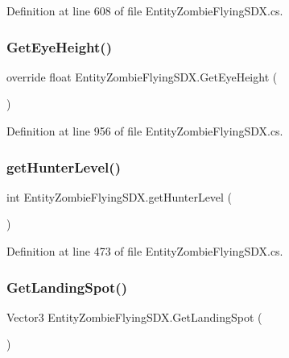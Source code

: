 Definition at line 608 of file Entity\+Zombie\+Flying\+S\+D\+X.\+cs.

\mbox{\label{class_entity_zombie_flying_s_d_x_a947821e6f45d591ca5e5bda52b58ff48}} 
\subsubsection{\texorpdfstring{GetEyeHeight()}{GetEyeHeight()}}
{\footnotesize\ttfamily override float Entity\+Zombie\+Flying\+S\+D\+X.\+Get\+Eye\+Height (\begin{DoxyParamCaption}{ }\end{DoxyParamCaption})}



Definition at line 956 of file Entity\+Zombie\+Flying\+S\+D\+X.\+cs.

\mbox{\label{class_entity_zombie_flying_s_d_x_ad26e497d00cc42de478bdbaaec5c6c70}} 
\subsubsection{\texorpdfstring{getHunterLevel()}{getHunterLevel()}}
{\footnotesize\ttfamily int Entity\+Zombie\+Flying\+S\+D\+X.\+get\+Hunter\+Level (\begin{DoxyParamCaption}{ }\end{DoxyParamCaption})}



Definition at line 473 of file Entity\+Zombie\+Flying\+S\+D\+X.\+cs.

\mbox{\label{class_entity_zombie_flying_s_d_x_ac917ce92f0b0dba7de0a69fb08d3dc2d}} 
\subsubsection{\texorpdfstring{GetLandingSpot()}{GetLandingSpot()}}
{\footnotesize\ttfamily Vector3 Entity\+Zombie\+Flying\+S\+D\+X.\+Get\+Landing\+Spot (\begin{DoxyParamCaption}{ }\end{DoxyParamCaption})}



